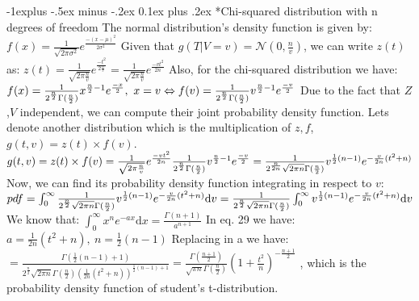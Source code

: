 \documentclass[9pt,landscape]{article}
\makeatletter
\renewcommand{\subsection}{\@startsection{subsection}{2}{0mm}%
                                {-1explus -.5ex minus -.2ex}%
                                {0.1ex plus .2ex}%
                                {\normalfont\scriptsize\bfseries}}
\makeatother
\begin{document}
\begin{multicols}{3}
\subsection*{Chi-squared distribution with n degrees of freedom}
The normal distribution's density function is given by:
$
f(x) = \frac{1}{\sqrt{2\pi\sigma^2}}e^{\frac{-(x-\mu)^2}{2\sigma^2}}
$
Given that $g(T|V=v) =\mathcal{N}(0,\frac{n}{v})$, we can write $z(t)$ as:
$
z(t) = \frac{1}{\sqrt{2\pi\frac{n}{v}}}e^{\frac{-t^2}{2 \frac{n}{v}}}
 = \frac{1}{\sqrt{2\pi\frac{n}{v}}}e^{\frac{-vt^2}{2 n}}
$
Also, for the chi-squared distribution we have:
$
f(x) = \frac{1}{2^{\frac{n}{2}}\Gamma(\frac{n}{2})}x^{\frac{n}{2} - 1}e^{\frac{-x}{2}},\ x=v \Leftrightarrow\\
f(v) = \frac{1}{2^{\frac{n}{2}}\Gamma(\frac{n}{2})}v^{\frac{n}{2} - 1}e^{\frac{-v}{2}}
$
Due to the fact that $Z$,$V$ independent, we can compute their joint probability density function. Lets denote another distribution which is the multiplication of $z,f$, $g(t,v) = z(t) \times f(v)$.
$
g(t,v) = z(t) \times f(v)\\
=\frac{1}{\sqrt{2\pi\frac{n}{v}}}e^{\frac{-vt^2}{2 n}} \frac{1}{2^{\frac{n}{2}}\Gamma(\frac{n}{2})}v^{\frac{n}{2} - 1}e^{\frac{-v}{2}}
=\frac{1}{2^{\frac{n}{2n}} \sqrt{2\pi n}\Gamma(\frac{n}{2})}v^{\frac{1}{2}(n-1)} e^{-\frac{v}{2n}(t^2+n)}\\
$
Now, we can find its probability density function integrating in respect to $v$:
$
pdf = \int_0^\infty \frac{1}{2^{\frac{n}{2}} \sqrt{2\pi n}\Gamma(\frac{n}{2})}v^{\frac{1}{2}(n-1)} e^{-\frac{v}{2n}(t^2+n)} \mathrm{d}v \\
= \frac{1}{2^{\frac{n}{2}} \sqrt{2\pi n}\Gamma(\frac{n}{2})} \int_0^\infty v^{\frac{1}{2}(n-1)} e^{-\frac{v}{2n}(t^2+n)} \mathrm{d}v
$
We know that:
$
\int_0^\infty x^n e^{-ax} \mathrm{d}x = \frac{\Gamma(n+1)}{a^{n+1}}
$
In eq. 29 we have:
$
a = \frac{1}{2n}(t^2+n),\ n = \frac{1}{2}(n-1)
$
Replacing in a we have:
$
= \frac{\Gamma(\frac{1}{2}(n-1)+1)}{2^{\frac{n}{2}} \sqrt{2\pi n}\Gamma(\frac{n}{2}) (\frac{1}{2n}(t^2+n))^{\frac{1}{2}(n-1)+1}}
= \frac{\Gamma(\frac{n+1}{2})}{\sqrt{\pi n}\Gamma(\frac{n}{2})} (1 + \frac{t^2}{n})^{-\frac{n+1}{2}}
$
, which is the probability density function of student's t-distribution.


\end{multicols}
\end{document}
